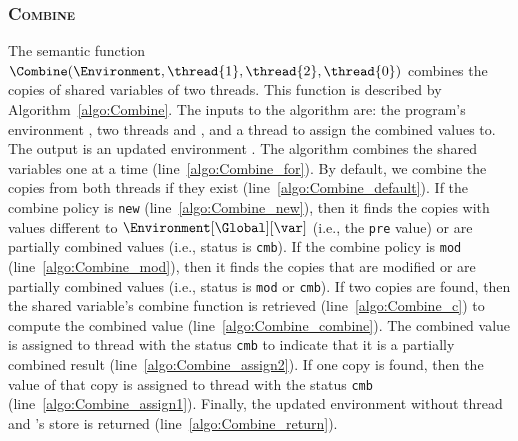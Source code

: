 \subsubsection{\textsc{Combine}}
\label{sec:forec_Combine}
The semantic function $\Combine(\Environment, \thread{1}, \thread{2}, \thread{0})$ combines 
the copies of shared variables of two threads. This 
function is described by Algorithm~\ref{algo:Combine}. The inputs to the 
algorithm are: the program's environment \Environment{}, two threads 
 and , and a thread  to assign the 
combined values to. The output is an updated environment \Environment{}.
The algorithm combines the shared variables one at a time (line~\ref{algo:Combine_for}).
By default, we combine the copies from both threads if they exist (line~\ref{algo:Combine_default}).
If the combine policy is \verb$new$ (line~\ref{algo:Combine_new}), then it finds the copies with 
values different to $\Environment[\Global][\var]$ (i.e., the \verb$pre$ value) 
or are partially combined values (i.e., status is \verb$cmb$).
If the combine policy is \verb$mod$ (line~\ref{algo:Combine_mod}), then it finds the copies 
that are modified or are partially combined values (i.e., status is \verb$mod$ or \verb$cmb$).
If two copies are found, then the shared variable's combine 
function is retrieved (line~\ref{algo:Combine_c}) to compute the combined value (line~\ref{algo:Combine_combine}).
The combined value is assigned to thread  with the status 
\verb$cmb$ to indicate that it is a partially combined result (line~\ref{algo:Combine_assign2}).
If one copy is found, then the value of that copy is assigned to thread 
with the status \verb$cmb$ (line~\ref{algo:Combine_assign1}). 
Finally, the updated environment \Environment{} without thread  
and 's store is returned (line~\ref{algo:Combine_return}).

